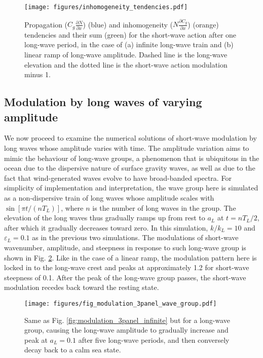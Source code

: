 \documentclass[lineno]{jfm}
\begin{document}
\begin{figure}
  \centering
  \texttt{[image: figures/inhomogeneity\_tendencies.pdf]}
  \caption{
    Propagation ($C_g \frac{\partial N}{\partial x}$) (blue) and inhomogeneity
    ($N \frac{\partial C_g}{\partial x}$) (orange) tendencies and their sum
    (green) for the short-wave action after one long-wave period, in the case of
    (a) infinite long-wave train and (b) linear ramp of long-wave amplitude.
    Dashed line is the long-wave elevation and the dotted line is the short-wave
    action modulation minus 1.
  }
  \label{fig:inhomogeneity_tendencies}
\end{figure}

\subsection{Modulation by long waves of varying amplitude}
\label{subsection:wave_groups}

We now proceed to examine the numerical solutions of short-wave modulation by
long waves whose amplitude varies with time.
The amplitude variation aims to mimic the behaviour of long-wave groups, a
phenomenon that is ubiquitous in the ocean due to the dispersive nature of
surface gravity waves, as well as due to the fact that wind-generated waves
evolve to have broad-banded spectra.
For simplicity of implementation and interpretation, 
the wave group here is simulated as a non-dispersive train of long waves whose
amplitude scales with $\sin[\pi t / (n T_L)]$, where $n$ is the number of
long waves in the group.
The elevation of the long waves thus gradually ramps up from rest to $a_L$ at
$t = n T_L / 2$, after which it gradually decreases toward zero.
In this simulation, $k/k_L = 10$ and $\varepsilon_L = 0.1$ as in the previous
two simulations.
The modulations of short-wave wavenumber, amplitude, and steepness in response
to such long-wave group is shown in Fig. \ref{fig:modulation_3panel_groups}.
Like in the case of a linear ramp, the modulation pattern here is locked in to
the long-wave crest and peaks at approximately 1.2 for short-wave steepness of 0.1.
After the peak of the long-wave group passes, the short-wave modulation recedes
back toward the resting state.

\begin{figure}
\centering
\texttt{[image: figures/fig\_modulation\_3panel\_wave\_group.pdf]}
\caption{
  Same as Fig. \ref{fig:modulation_3panel_infinite} but for a long-wave group,
  causing the long-wave amplitude to gradually increase and peak at $a_L = 0.1$
  after five long-wave periods, and then conversely decay back to a calm sea state.
}
\label{fig:modulation_3panel_groups}
\end{figure}
\end{document}
